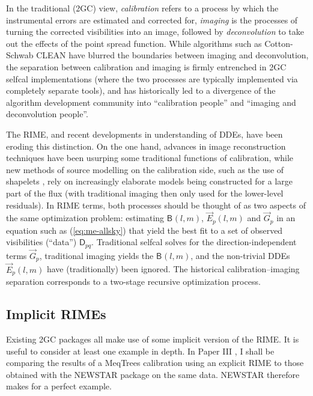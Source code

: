 \documentclass{aa}
\newcommand{\jones}[2]{\vec {#1}_{#2}}
\newcommand{\coh}[2]{\mathsf{{#1}}_{{#2}}}
\begin{document}
In the traditional (2GC) view, \emph{calibration} refers to a process by which the instrumental errors are estimated and corrected for, \emph{imaging} is the processes of turning the corrected visibilities into an image, followed by \emph{deconvolution} to take out the effects of the point spread function. While algorithms such as Cotton-Schwab CLEAN \citep{Schwab:csclean} have blurred the boundaries between imaging and deconvolution, the separation between calibration and imaging is firmly entrenched in 2GC selfcal implementations (where the two processes are typically implemented via completely separate tools), and has historically led to a divergence of the algorithm development community into ``calibration people'' and ``imaging and deconvolution people''. 

The RIME, and recent developments in understanding of DDEs, have been eroding this distinction. On the one hand, advances in image reconstruction techniques \citep[for an overview, see][]{Rau:DDEs} have been usurping some traditional functions of calibration, while new methods of source modelling on the calibration side, such as the use of shapelets \citep{Yatawatta:shapelets}, rely on increasingly elaborate models being constructed for a large part of the flux (with traditional imaging then only used for the lower-level residuals). In RIME terms, both processes should be thought of as two aspects of the same optimization problem: estimating $\coh{B}{}(l,m)$, $\jones{E}{p}(l,m)$ and $\jones{G}{p}$ in an equation such as (\ref{eq:me-allsky}) that yield the best fit to a set of observed visibilities  (``data'') $\coh{D}{pq}$. Traditional selfcal solves for the direction-independent terms $\jones{G}{p}$, traditional imaging yields the $\coh{B}{}(l,m)$, and the non-trivial DDEs $\jones{E}{p}(l,m)$ have (traditionally) been ignored. The historical calibration--imaging separation corresponds to a two-stage recursive optimization process. 

\subsection{\label{sec:implicit-me-newstar}Implicit RIMEs}

Existing 2GC packages all make use of some implicit version of the RIME. It is useful to consider at least one example in depth. In Paper III \citep{RRIME3}, I shall be comparing the results of a MeqTrees calibration using an explicit RIME to those obtained with the NEWSTAR package on the same data. NEWSTAR therefore makes for a perfect example.
\end{document}
